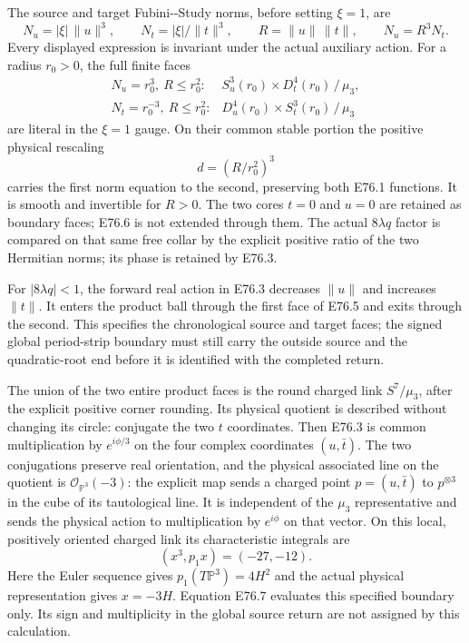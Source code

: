 The source and target Fubini-\/-Study norms, before setting
\(\xi=1\), are
\[
 N_u=|\xi|\,\|u\|^3,\qquad
 N_t=|\xi|/\|t\|^3,\qquad
 R=\|u\|\,\|t\|,\qquad N_u=R^3N_t.              \tag{E76.4}
\]
Every displayed expression is invariant under the actual
auxiliary action. For a radius \(r_0>0\), the full finite faces
\[
\begin{array}{ll}
 N_u=r_0^3,\ R\le r_0^2:
       &S^3_u(r_0)\times D^4_t(r_0)\,/\,\mu_3,\\
 N_t=r_0^{-3},\ R\le r_0^2:
       &D^4_u(r_0)\times S^3_t(r_0)\,/\,\mu_3
\end{array}                                    \tag{E76.5}
\]
are literal in the \(\xi=1\) gauge. On their common stable
portion the positive physical rescaling
\[
                       d=(R/r_0^2)^3          \tag{E76.6}
\]
carries the first norm equation to the second, preserving
both E76.1 functions. It is smooth and invertible for \(R>0\).
The two cores \(t=0\) and \(u=0\) are retained as boundary
faces; E76.6 is not extended through them. The actual
\(8\lambda q\) factor is compared on that same free collar
by the explicit positive ratio of the two Hermitian norms;
its phase is retained by E76.3.

For \(|8\lambda q|<1\), the forward real action in E76.3
decreases \(\|u\|\) and increases \(\|t\|\).
It enters the product ball through the first face of E76.5
and exits through the second. This specifies the chronological
source and target faces; the signed global period-strip
boundary must still carry the outside source and the
quadratic-root end before it is identified with the completed
return.

The union of the two entire product faces is the round
charged link \(S^7/\mu_3\), after the explicit positive
corner rounding. Its physical quotient is described without
changing its circle: conjugate the two \(t\) coordinates.
Then E76.3 is common multiplication by \(e^{i\phi/3}\)
on the four complex coordinates \((u,\bar t)\).
The two conjugations preserve real orientation, and the
physical associated line on the quotient is
\(\mathcal O_{\mathbb P^3}(-3)\): the explicit map sends a
charged point \(p=(u,\bar t)\) to \(p^{\otimes3}\) in the
cube of its tautological line. It is independent of the
\(\mu_3\) representative and sends the physical action to
multiplication by \(e^{i\phi}\) on that vector. On this local, positively
oriented charged link its characteristic integrals are
\[
                 (x^3,p_1x)=(-27,-12).          \tag{E76.7}
\]
Here the Euler sequence gives \(p_1(T\mathbb P^3)=4H^2\)
and the actual physical representation gives \(x=-3H\).
Equation E76.7 evaluates this specified boundary only.
Its sign and multiplicity in the global source return
are not assigned by this calculation.

